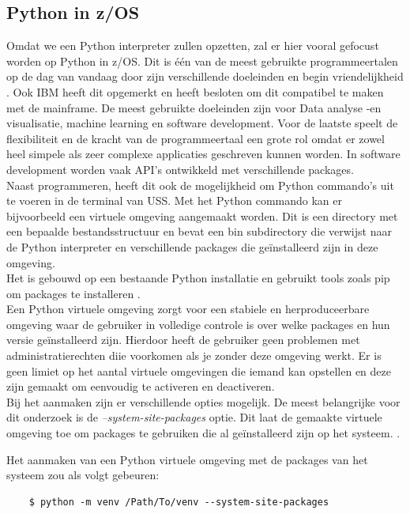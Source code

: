 \subsection{Python in z/OS}
Omdat we een Python interpreter zullen opzetten, zal er hier vooral gefocust worden op Python in z/OS. Dit is één van de meest gebruikte programmeertalen op de dag van vandaag door zijn verschillende doeleinden en begin vriendelijkheid \autocite{Johnson2023}. Ook IBM heeft dit opgemerkt en heeft besloten om dit compatibel te maken met de mainframe. De meest gebruikte doeleinden zijn voor Data analyse -en visualisatie, machine learning en software development. Voor de laatste speelt de flexibiliteit en de kracht van de programmeertaal een grote rol omdat er zowel heel simpele als zeer complexe applicaties geschreven kunnen worden. In software development worden vaak API's ontwikkeld met verschillende packages. \autocite{Kosourova2022} \\

Naast programmeren, heeft dit ook de mogelijkheid om Python commando's uit te voeren in de terminal van USS. Met het Python commando kan er bijvoorbeeld een virtuele omgeving aangemaakt worden. Dit is een directory met een bepaalde bestandsstructuur en bevat een bin subdirectory die verwijst naar de Python interpreter en verschillende packages die geïnstalleerd zijn in deze omgeving.  \autocite{UniPrinceton2022} \\
Het is gebouwd op een bestaande Python installatie en gebruikt tools zoals pip om packages te installeren \autocite{PSF2024}. \\

Een Python virtuele omgeving zorgt voor een stabiele en herproduceerbare omgeving waar de gebruiker in volledige controle is over welke packages en hun versie geïnstalleerd zijn. Hierdoor heeft de gebruiker geen problemen met administratierechten diie voorkomen als je zonder deze omgeving werkt. Er is geen limiet op het aantal virtuele omgevingen die iemand kan opstellen en deze zijn gemaakt om eenvoudig te activeren en deactiveren. \autocite{UniPrinceton2022} \\

Bij het aanmaken zijn er verschillende opties mogelijk. De meest belangrijke voor dit onderzoek is de \textit{--system-site-packages} optie. Dit laat de gemaakte virtuele omgeving toe om packages te gebruiken die al geïnstalleerd zijn op het systeem. \autocite{PSF2024}.

Het aanmaken van een Python virtuele omgeving met de packages van het systeem zou als volgt gebeuren:
\begin{lstlisting}
    $ python -m venv /Path/To/venv --system-site-packages
\end{lstlisting}

